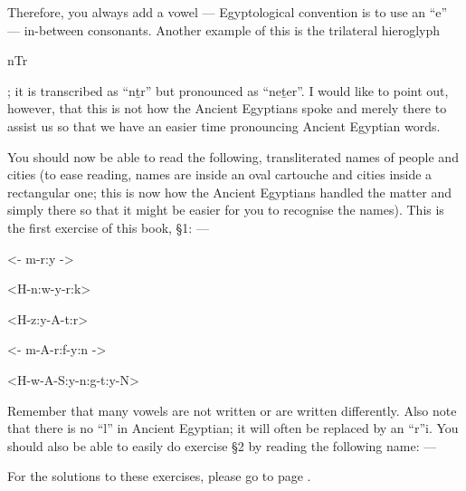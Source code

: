 \documentclass[a5paper,twoside,11pt]{report}
\begin{document}
		Therefore, you always add a vowel — Egyptological convention is to use an “e” — in-between consonants. Another example of this is the trilateral hieroglyph \begin{hieroglyph}nTr\end{hieroglyph}; it is transcribed as “nṯr” but pronounced as “neṯer”. I would like to point out, however, that this is not how the Ancient Egyptians spoke and merely there to assist us so that we have an easier time pronouncing Ancient Egyptian words. 

		You should now be able to read the following, transliterated names of people and cities (to ease reading, names are inside an oval cartouche and cities inside a rectangular one; this is now how the Ancient Egyptians handled the matter and simply there so that it might be easier for you to recognise the names). This is the first exercise of this book, §1: —
		
		\begin{center}
			\begin{hieroglyph}<- m-r:y ->\end{hieroglyph} \bigskip\linebreak\bigskip
			\begin{hieroglyph}<H-n:w-y-r:k>\end{hieroglyph} \linebreak\bigskip
			\begin{hieroglyph}<H-z:y-A-t:r>\end{hieroglyph} \linebreak\bigskip
			\begin{hieroglyph}<- m-A-r:f-y:n ->\end{hieroglyph} \linebreak\bigskip
			\begin{hieroglyph}<H-w-A-S:y-n:g-t:y-N>\end{hieroglyph} \linebreak
		\end{center}

		Remember that many vowels are not written or are written differently. Also note that there is no “l” in Ancient Egyptian; it will often be replaced by an “r”i.
		You should also be able to easily do exercise §2 by reading the following name: —
      \begin{center}
      \end{center}
    For the solutions to these exercises, please go to page \pageref{solutions}.
\end{document}
